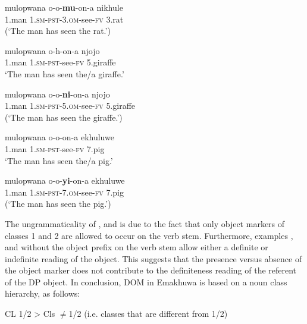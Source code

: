 \documentclass[output=paper]{langsci/langscibook}
\begin{document}
\ea
\gll *mulopwana        o-o-\textbf{mu}{}-on-a                        nikhule\\
     {1.man                  1.}{\textsc{sm-pst}}{{}-3.}{\textsc{om-}}{see}{\textsc{{}-fv}}         {3.rat}\\
\glt (‘The man has seen the rat.’)
\z

\ea
\gll mulopwana         o\textup{{}-}h-on-a                       njojo\\
     {1.man                 }{\textsc{1.sm-pst}}{{}-see-}{\textsc{fv}}           {5.giraffe}\\
\glt ‘The man has seen the/a giraffe.’
\z

\ea
\gll *mulopwana        o-o-\textbf{ni}{}-on-a                         njojo\\
     {1.man                  1}{\textsc{.sm-pst}}{{}-5.}{\textsc{om}}{{}-see-}{\textsc{fv}}        {5.giraffe}\\
\glt (‘The man has seen the giraffe.’)
\z

\ea
\gll mulopwana           o-o-on-a                           ekhuluwe\\
     {1.man                   1.}{\textsc{sm-pst}}{{}-see-}{\textsc{fv}}               {7.pig}\\
\glt ‘The man has seen the/a pig.’
\z

\ea
\gll *mulopwana         o-o-\textbf{yi}{}-on-a                           ekhuluwe\\
     {1.man                   1.}{\textsc{sm-pst}}{{}-7.}{\textsc{om}}{{}-see-}{\textsc{fv}}          {7.pig}\\
\glt (‘The man has seen the pig.’)
\z

The ungrammaticality of ,  and  is due to the fact that only object markers of classes 1 and 2 are allowed to occur on the verb stem. Furthermore, examples ,  and  without the object prefix on the verb stem allow either a definite or indefinite reading of the object. This suggests that the presence versus absence of the object marker does not contribute to the definiteness reading of the referent of the DP object. In conclusion, DOM in Emakhuwa is based on a noun class hierarchy, as follows:

\ea
  {{}CL 1/2 {\textgreater} Cls ${\neq}$1/2 (i.e. classes that are different from 1/2)}
\z
\end{document}
